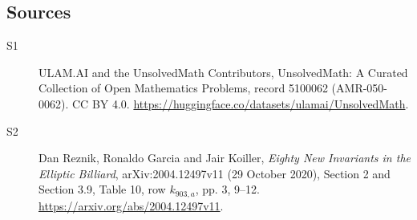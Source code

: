 \documentclass[11pt]{article}
\begin{document}
\subsection{Sources}
\begin{description}
\item[\hypertarget{source:5100062:1}{S1}] ULAM.AI and the UnsolvedMath Contributors, UnsolvedMath: A Curated Collection of Open Mathematics Problems, record 5100062 (AMR-050-0062). CC BY 4.0. \url{https://huggingface.co/datasets/ulamai/UnsolvedMath}.
\item[\hypertarget{source:5100062:2}{S2}] Dan Reznik, Ronaldo Garcia and Jair Koiller, \emph{Eighty New Invariants in the Elliptic Billiard}, arXiv:2004.12497v11 (29 October 2020), Section 2 and Section 3.9, Table 10, row $k_{903,a}$, pp. 3, 9--12. \url{https://arxiv.org/abs/2004.12497v11}.
\end{description}
\label{end:5100062}
\end{document}
